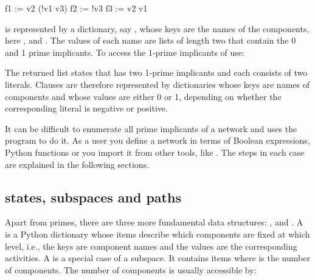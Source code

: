 \documentclass[letterpaper,10pt,english]{sphinxmanual}
\begin{document}
\begin{sphinxVerbatim}[commandchars=\\\{\}]
f1 := v2 \PYGZam{} (!v1 \textbar{} v3)
f2 := !v3
f3 := v2 \textbar{} v1
\end{sphinxVerbatim}

is represented by a dictionary, say , whose keys are the names of the components, here ,  and .
The values of each name are lists of length two that contain the 0 and 1 prime implicants.
To access the 1-prime implicants of  use:

\begin{sphinxVerbatim}[commandchars=\\\{\}]
\PYG{p}{[}\PYG{p}{]}\PYG{p}{[}\PYG{p}{]}
\end{sphinxVerbatim}

The returned list states that  has two 1-prime implicants and each consists of two literals.
Clauses are therefore represented by dictionaries whose keys are names of components and whose values are either 0 or 1,
depending on whether the corresponding literal is negative or positive.

It can be difficult to enumerate all prime implicants of a network and  uses the program {\hyperref[\detokenize{Installation:installation-bnettoprime}]{}} to do it.
As a user you define a network in terms of Boolean expressions, Python functions or you import it from other tools, like .
The steps in each case are explained in the following sections.


\subsection{states, subspaces and paths}
\label{\detokenize{Manual:states-subspaces-paths}}\label{\detokenize{Manual:states-subspaces-and-paths}}
Apart from primes, there are three more fundamental data structures: ,  and .
A  is a Python dictionary whose items describe which components are fixed at which level, i.e., the keys are component names and the values are the corresponding activities.
A  is a special case of a subspace.
It contains  items where  is the number of components.
The number of components is usually accessible by:
\end{document}
